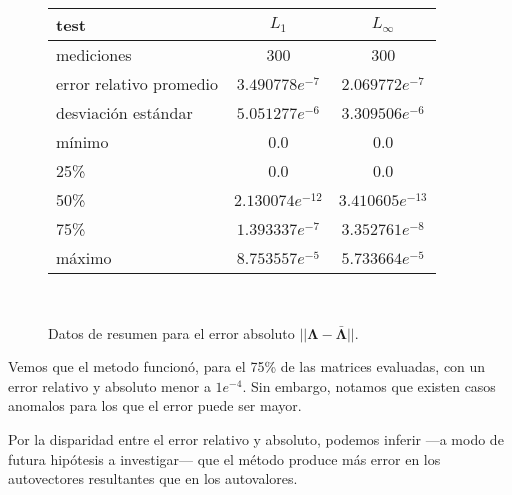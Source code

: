 \vspace{1em}
\begin{figure}[!htbp]
    \begin{tabular}{ |l|c|c| } 
    \hline
    test                    & $L_1$             & $L_\infty$ \\
    \hline
    mediciones              & 300               & 300 \\
    error relativo promedio & $3.490778e^{-7}$  & $2.069772e^{-7}$ \\
    desviación estándar     & $5.051277e^{-6}$  & $3.309506e^{-6}$ \\
    mínimo                  & 0.0               & 0.0 \\
    25\%                    & 0.0               & 0.0 \\
    50\%                    & $2.130074e^{-12}$ & $3.410605e^{-13}$ \\
    75\%                    & $1.393337e^{-7}$  & $3.352761e^{-8}$ \\
    máximo                  & $8.753557e^{-5}$  & $5.733664e^{-5}$ \\
    \hline
    \end{tabular} \\
    \bigskip
    \caption{Datos de resumen para el error absoluto $||\mathbf{\Lambda} - \mathbf{\bar{\Lambda}}||$.} \label{error_absoluto}
\end{figure}

\vspace{1em}
Vemos que el metodo funcionó, para el 75\% de las matrices evaluadas, con un error relativo y absoluto menor a $1e^{-4}$. Sin embargo, notamos que existen casos anomalos para los que el error puede ser mayor.

Por la disparidad entre el error relativo y absoluto, podemos inferir ---a modo de futura hipótesis a investigar--- que el método produce más error en los autovectores resultantes que en los autovalores.
